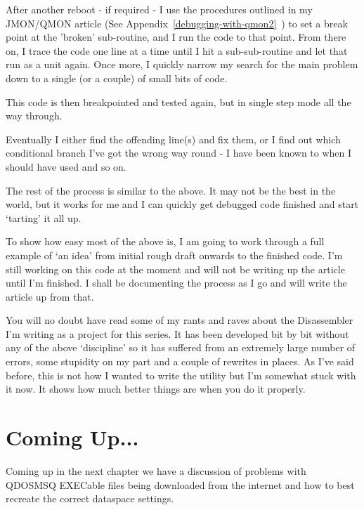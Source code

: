 After another reboot -{} if required -{} I use the procedures outlined
      in my JMON/QMON article (See Appendix~\ref{debugging-with-qmon2}~) to set a break point at the 'broken'
      sub-{}routine, and I run the code to that point. From there on, I trace
      the code one line at a time until I hit a sub-{}sub-{}routine and let that
      run as a unit again. Once more, I quickly narrow my search for the main
      problem down to a single (or a couple) of small bits of code.

This code is then breakpointed and tested again, but in single
      step mode all the way through.

Eventually I either find the offending line(s) and fix them, or I
      find out which conditional branch I've got the wrong way round -{} I have
      been known to  when I should have used  and so on.

The rest of the process is similar to the above. It may not be the
      best in the world, but it works for me and I can quickly get debugged
      code finished and start `tarting' it all up.

To show how easy most of the above is, I am going to work through
      a full example of `an idea' from initial rough draft onwards to the
      finished code. I'm still working on this code at the moment and will not
      be writing up the article until I'm finished. I shall be documenting the
      process as I go and will write the article up from that.

You will no doubt have read some of my rants and raves about the
      Disassembler I'm writing as a project for this series. It has been
      developed bit by bit without any of the above `discipline' so it has
      suffered from an extremely large number of errors, some stupidity on my
      part and a couple of rewrites in places. As I've said before, this is
      not how I wanted to write the utility but I'm somewhat stuck with it
      now. It shows how much better things are when you do it
      properly.


\section{Coming Up...}
\label{ch14-the-end}%

Coming up in the next chapter we have a discussion of problems with QDOSMSQ EXECable
files being downloaded from the internet and how to best recreate the correct dataspace
settings.

